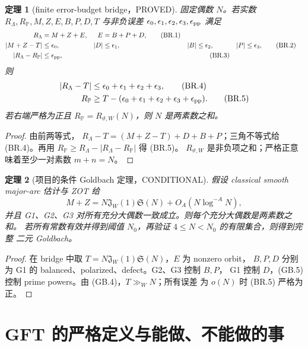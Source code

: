 \documentclass[11pt,a4paper]{ctexart}
\newtheorem{theorem}{定理}[section]
\theoremstyle{definition}
\newcommand{\1}{\mathbf 1}
\newcommand{\PROVED}{\textcolor{green!40!black}{\textsf{PROVED}}}
\newcommand{\CONDITIONAL}{\textcolor{orange!75!black}{\textsf{CONDITIONAL}}}
\begin{document}
\begin{theorem}[finite error-budget bridge，\PROVED]
固定偶数 $N$。若实数
$R_\Lambda,R_{\mathbb P},M,Z,E,B,P,D,T$ 与非负误差
$\epsilon_0,\epsilon_1,\epsilon_2,\epsilon_3,\epsilon_{\rm pp}$ 满足
\begin{align}
 R_\Lambda&=M+Z+E, & E&=B+P+D,                      \tag{BR.1}\\
 |M+Z-T|&\le\epsilon_0,& |D|&\le\epsilon_1,
 &|B|&\le\epsilon_2,&|P|&\le\epsilon_3,           \tag{BR.2}\\
 |R_\Lambda-R_{\mathbb P}|&\le\epsilon_{\rm pp}, &&&& \tag{BR.3}
\end{align}
则
\begin{align}
 |R_\Lambda-T|&\le\epsilon_0+\epsilon_1+\epsilon_2+\epsilon_3,
                                                        \tag{BR.4}\\
 R_{\mathbb P}&\ge T-(\epsilon_0+\epsilon_1+\epsilon_2+
 \epsilon_3+\epsilon_{\rm pp}).                     \tag{BR.5}
\end{align}
若右端严格为正且 $R_{\mathbb P}=R_{\vartheta,W}(N)$，则 $N$ 是两素数之和。
\end{theorem}
\begin{proof}
由前两等式，
$R_\Lambda-T=(M+Z-T)+D+B+P$；三角不等式给 (BR.4)。再用
$R_{\mathbb P}\ge R_\Lambda-|R_\Lambda-R_{\mathbb P}|$ 得 (BR.5)。
$R_{\vartheta,W}$ 是非负项之和；严格正意味着至少一对素数 $m+n=N$。
\end{proof}

\begin{theorem}[项目的条件 Goldbach 定理，\CONDITIONAL]
假设 classical smooth major-arc 估计与 ZOT 给
\[
 M+Z=N\mathfrak J_W(1)\mathfrak S(N)+O_A(N\log^{-A}N),\tag{GB.6}
\]
并且 G1、G2、G3 对所有充分大偶数一致成立。则每个充分大偶数是两素数之和。
若所有常数有效并得到阈值 $N_0$，再验证 $4\le N<N_0$ 的有限集合，则得到完整
二元 Goldbach。
\end{theorem}
\begin{proof}
在 bridge 中取 $T=N\mathfrak J_W(1)\mathfrak S(N)$，$E$ 为 nonzero orbit，
$B,P,D$ 分别为 G1 的 balanced、polarized、defect。G2、G3 控制 $B,P$，
G1 控制 $D$，(GB.5) 控制 prime powers。由 (GB.4)，$T\gg_W N$；所有误差
为 $o(N)$ 时 (BR.5) 严格为正。
\end{proof}

\section{GFT 的严格定义与能做、不能做的事}
\label{sec:gft}
\end{document}
